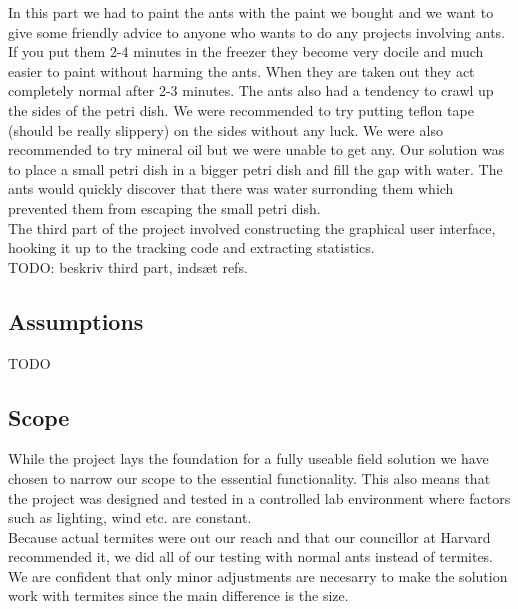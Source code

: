 In this part we had to paint the ants with the paint we bought and we want to give some friendly advice to anyone who wants to do any projects involving ants. If you put them 2-4 minutes in the freezer they become very docile and much easier to paint without harming the ants. When they are taken out they act completely normal after 2-3 minutes. The ants also had a tendency to crawl up the sides of the petri dish. We were recommended to try putting teflon tape (should be really slippery) on the sides without any luck. We were also recommended to try mineral oil but we were unable to get any. Our solution was to place a small petri dish in a bigger petri dish and fill the gap with water. The ants would quickly discover that there was water surronding them which prevented them from escaping the small petri dish. \\

The third part of the project involved constructing the graphical user interface, hooking it up to the tracking code and extracting statistics.  \\

TODO: beskriv third part, indsæt refs.

\subsection{Assumptions}

TODO

\subsection{Scope}


While the project lays the foundation for a fully useable field solution we have chosen to narrow our scope to the essential functionality. This also means that the project was designed and tested in a controlled lab environment where factors such as lighting, wind etc. are constant. \\

Because actual termites were out our reach and that our councillor at Harvard recommended it, we did all of our testing with normal ants instead of termites. We are confident that only minor adjustments are necesarry to make the solution work with termites since the main difference is the size. \\

